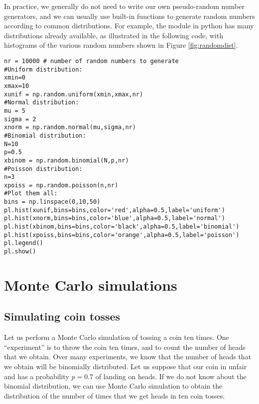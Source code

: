 In practice, we generally do not need to write our own pseudo-random number generators, and we can usually use built-in functions to generate random numbers according to common distributions. For example, the  module in python has many distributions already available, as illustrated in the following code, with histograms of the various random numbers shown in Figure \ref{fig:randomdist}.
\begin{lstlisting}[frame=single] 
nr = 10000 # number of random numbers to generate
#Uniform distribution:
xmin=0
xmax=10
xunif = np.random.uniform(xmin,xmax,nr)
#Normal distribution:
mu = 5
sigma = 2
xnorm = np.random.normal(mu,sigma,nr)
#Binomial distribution:
N=10
p=0.5
xbinom = np.random.binomial(N,p,nr)
#Poisson distribution:
n=3
xpoiss = np.random.poisson(n,nr)
#Plot them all:
bins = np.linspace(0,10,50)
pl.hist(xunif,bins=bins,color='red',alpha=0.5,label='uniform')
pl.hist(xnorm,bins=bins,color='blue',alpha=0.5,label='normal')
pl.hist(xbinom,bins=bins,color='black',alpha=0.5,label='binomial')
pl.hist(xpoiss,bins=bins,color='orange',alpha=0.5,label='poisson')
pl.legend()
pl.show()
\end{lstlisting}

\section{Monte Carlo simulations}
\subsection{Simulating coin tosses}
Let us perform a Monte Carlo simulation of tossing a coin ten times. One ``experiment'' is to throw the coin ten times, and to count the number of heads that we obtain. Over many experiments, we know that the number of heads that we obtain will be binomially distributed. Let us suppose that our coin in unfair and has a probability $p=0.7$ of landing on heads. If we do not know about the binomial distribution, we can use Monte Carlo simulation to obtain the distribution of the number of times that we get heads in ten coin tosses.


